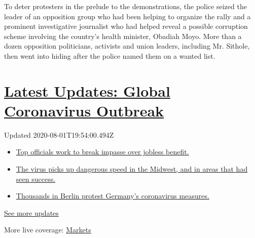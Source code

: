 To deter protesters in the prelude to the demonstrations, the police
seized the leader of an opposition group who had been helping to
organize the rally and a prominent investigative journalist who had
helped reveal a possible corruption scheme involving the country's
health minister, Obadiah Moyo. More than a dozen opposition politicians,
activists and union leaders, including Mr. Sithole, then went into
hiding after the police named them on a wanted list.

\hypertarget{latest-updates-global-coronavirus-outbreak}{%
\section{\texorpdfstring{\href{https://www.nytimes3xbfgragh.onion/2020/08/01/world/coronavirus-covid-19.html?action=click\&pgtype=Article\&state=default\&region=MAIN_CONTENT_1\&context=storylines_live_updates}{Latest
Updates: Global Coronavirus
Outbreak}}{Latest Updates: Global Coronavirus Outbreak}}\label{latest-updates-global-coronavirus-outbreak}}

Updated 2020-08-01T19:54:00.494Z

\begin{itemize}
\tightlist
\item
  \href{https://www.nytimes3xbfgragh.onion/2020/08/01/world/coronavirus-covid-19.html?action=click\&pgtype=Article\&state=default\&region=MAIN_CONTENT_1\&context=storylines_live_updates\#link-3ac56579}{Top
  officials work to break impasse over jobless benefit.}
\item
  \href{https://www.nytimes3xbfgragh.onion/2020/08/01/world/coronavirus-covid-19.html?action=click\&pgtype=Article\&state=default\&region=MAIN_CONTENT_1\&context=storylines_live_updates\#link-8796723}{The
  virus picks up dangerous speed in the Midwest, and in areas that had
  seen success.}
\item
  \href{https://www.nytimes3xbfgragh.onion/2020/08/01/world/coronavirus-covid-19.html?action=click\&pgtype=Article\&state=default\&region=MAIN_CONTENT_1\&context=storylines_live_updates\#link-25930521}{Thousands
  in Berlin protest Germany's coronavirus measures.}
\end{itemize}

\href{https://www.nytimes3xbfgragh.onion/2020/08/01/world/coronavirus-covid-19.html?action=click\&pgtype=Article\&state=default\&region=MAIN_CONTENT_1\&context=storylines_live_updates}{See
more updates}

More live coverage:
\href{https://www.nytimes3xbfgragh.onion/live/2020/07/31/business/stock-market-today-coronavirus?action=click\&pgtype=Article\&state=default\&region=MAIN_CONTENT_1\&context=storylines_live_updates}{Markets}

